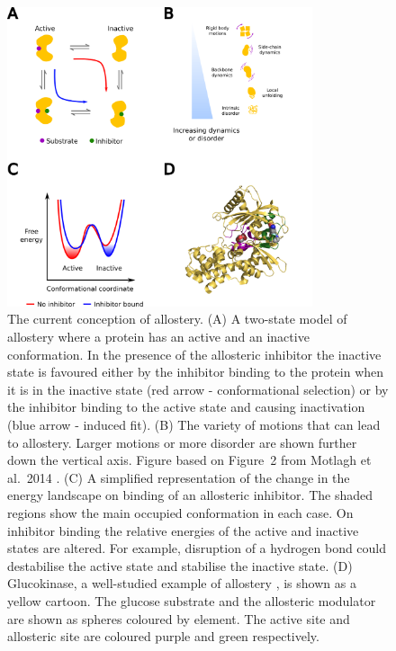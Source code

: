 \begin{figure}
\centering

\includegraphics[width=0.8\textwidth]{figures/allostery/allostery}

\caption[The current conception of allostery as a property of the conformational ensemble]
{The current conception of allostery.
(A) A two-state model of allostery where a protein has an active and an inactive conformation.
In the presence of the allosteric inhibitor the inactive state is favoured either by the inhibitor binding to the protein when it is in the inactive state (red arrow - conformational selection) or by the inhibitor binding to the active state and causing inactivation (blue arrow - induced fit).
(B) The variety of motions that can lead to allostery.
Larger motions or more disorder are shown further down the vertical axis.
Figure based on Figure~2 from Motlagh et al.\ 2014 \cite{Motlagh2014}.
(C) A simplified representation of the change in the energy landscape on binding of an allosteric inhibitor.
The shaded regions show the main occupied conformation in each case.
On inhibitor binding the relative energies of the active and inactive states are altered.
For example, disruption of a hydrogen bond could destabilise the active state and stabilise the inactive state.
(D) Glucokinase, a well-studied example of allostery \cite{Kamata2004}, is shown as a yellow cartoon.
The glucose substrate and the allosteric modulator are shown as spheres coloured by element.
The active site and allosteric site are coloured purple and green respectively.}

\label{fig:allostery}
\end{figure}


